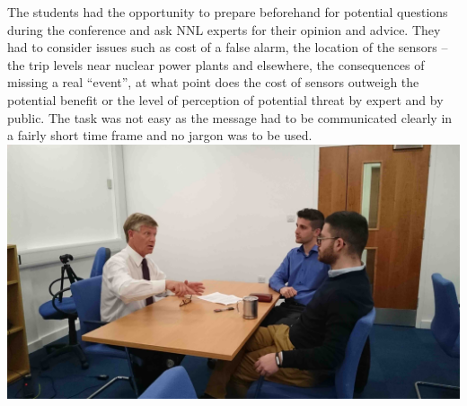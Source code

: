 \documentclass[11pt]{article}%
\begin{document}
\begin{minipage}{1.\textwidth}
\begin{multicols}{2}
The students had the opportunity to prepare beforehand for potential questions during the conference and ask NNL experts for their opinion and advice. They had to consider issues such as cost of a false alarm, the location of the sensors – the trip levels near nuclear power plants and elsewhere, the consequences of  missing a real “event”, at what point does the cost of sensors outweigh the potential benefit or the level of perception of potential threat by expert and by public. The task was not easy as the message had to be communicated clearly in a fairly short time frame and no jargon was to be used. 
\includegraphics[width=1\linewidth]{training/Picture5.jpg}

\end{multicols}
\end{minipage}



\end{document}
